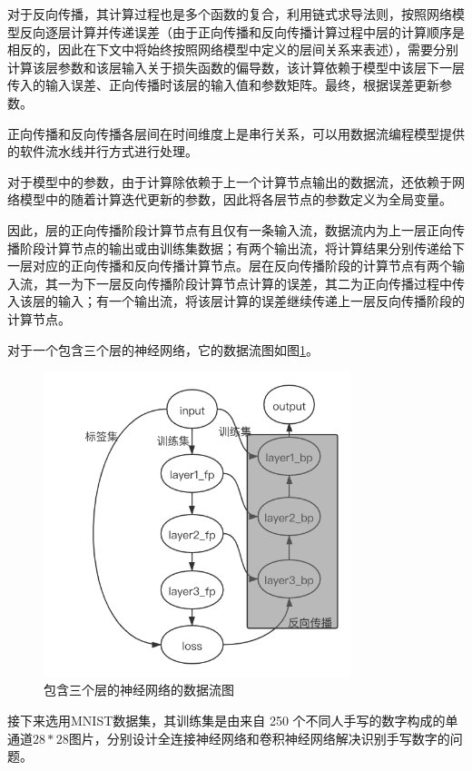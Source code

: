 对于反向传播，其计算过程也是多个函数的复合，利用链式求导法则，按照网络模型反向逐层计算并传递误差（由于正向传播和反向传播计算过程中层的计算顺序是相反的，因此在下文中将始终按照网络模型中定义的层间关系来表述），需要分别计算该层参数和该层输入关于损失函数的偏导数，该计算依赖于模型中该层下一层传入的输入误差、正向传播时该层的输入值和参数矩阵。最终，根据误差更新参数。

正向传播和反向传播各层间在时间维度上是串行关系，可以用数据流编程模型提供的软件流水线并行方式进行处理。

对于模型中的参数，由于计算除依赖于上一个计算节点输出的数据流，还依赖于网络模型中的随着计算迭代更新的参数，因此将各层节点的参数定义为全局变量。

因此，层的正向传播阶段计算节点有且仅有一条输入流，数据流内为上一层正向传播阶段计算节点的输出或由训练集数据；有两个输出流，将计算结果分别传递给下一层对应的正向传播和反向传播计算节点。层在反向传播阶段的计算节点有两个输入流，其一为下一层反向传播阶段计算节点计算的误差，其二为正向传播过程中传入该层的输入；有一个输出流，将该层计算的误差继续传递上一层反向传播阶段的计算节点。

对于一个包含三个层的神经网络，它的数据流图如图\ref{fig:dataflow_graph_of_net_with_3_layers}。
\begin{figure}[!t]
\centering
\includegraphics[width=0.8\textwidth]{../img/Chap_Application/Yu/dataflow_graph_of_net_with_3_layers.png}
\caption{包含三个层的神经网络的数据流图}
\label{fig:dataflow_graph_of_net_with_3_layers}
\end{figure}

接下来选用MNIST数据集，其训练集是由来自 250 个不同人手写的数字构成的单通道$28\ast28$图片，分别设计全连接神经网络和卷积神经网络解决识别手写数字的问题。


